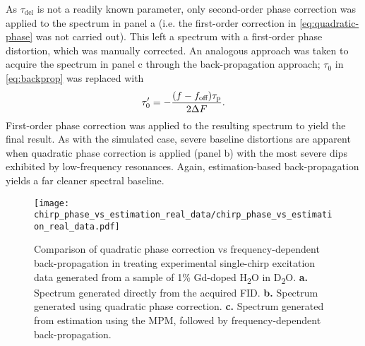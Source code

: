 As $\tau_{\text{del}}$ is not a readily known parameter, only second-order
phase correction was applied to the spectrum in panel a (i.e. the first-order
correction in \cref{eq:quadratic-phase} was not carried out). This left a
spectrum with a first-order phase distortion, which was manually corrected. An
analogous approach was taken to acquire the spectrum in panel c through the
back-propagation approach; $\tau_0$ in \cref{eq:backprop} was replaced with
\begin{equation}
    \tau_{0}^{\prime} = -\frac{(f - f_{\text{off}}) \tau_{\text{p}}}{2 \Delta F}.
\end{equation}
First-order phase correction was applied to the resulting spectrum to yield the
final result.
As with the simulated case, severe baseline distortions are apparent when
quadratic phase correction is applied (panel b) with the most severe dips
exhibited by low-frequency resonances. Again, estimation-based back-propagation
yields a far cleaner spectral baseline.
\begin{figure}
    \centering
    \texttt{[image: chirp\_phase\_vs\_estimation\_real\_data/chirp\_phase\_vs\_estimation\_real\_data.pdf]}
    \caption[
        Comparison of quadratic phase correction vs frequency-dependent
        back-propagation in treating experimental single-chirp excitation data
        generated from a sample of Gd-doped H\textsubscript{2}O in
        D\textsubscript{2}O.
    ]{
        Comparison of quadratic phase correction vs frequency-dependent
        back-propagation in treating experimental single-chirp excitation data
        generated from a sample of 1\% Gd-doped H\textsubscript{2}O in
        D\textsubscript{2}O.
        \textbf{a.} Spectrum generated directly from the acquired \ac{FID}.
        \textbf{b.} Spectrum generated using quadratic phase correction.
        \textbf{c.} Spectrum generated from estimation using the \ac{MPM},
        followed by frequency-dependent back-propagation.
    }
    \label{fig:bbqchili-real}
\end{figure}
